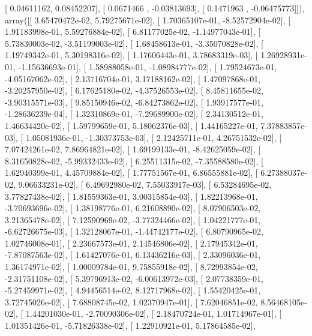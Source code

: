 \documentclass{article}
\begin{document}
       [ 0.04611162,  0.08452207],
       [ 0.0671466 , -0.03813693],
       [ 0.1471963 , -0.06475773]]), array([[  3.65470472e-02,   5.79275671e-02],
       [  1.70365107e-01,  -8.52572904e-02],
       [  1.91183998e-01,   5.59276884e-02],
       [  6.81177025e-02,  -1.14977043e-01],
       [  5.73830003e-02,  -3.51199003e-02],
       [  1.68458613e-01,  -3.35070828e-02],
       [  1.19749342e-01,   5.30198316e-02],
       [  1.17606443e-01,   3.78683319e-03],
       [  1.26928931e-01,  -1.15636693e-01],
       [  1.58988058e-01,  -1.08984777e-02],
       [  1.79524673e-01,  -4.05167062e-02],
       [  2.13716704e-01,   3.17188162e-02],
       [  1.47097868e-01,  -3.20257950e-02],
       [  6.17625180e-02,  -4.37526553e-02],
       [  8.45811655e-02,  -3.90315571e-03],
       [  9.85150946e-02,  -6.84273862e-02],
       [  1.93917577e-01,  -1.28636239e-04],
       [  1.32310869e-01,  -7.29689900e-02],
       [  2.34130512e-01,   1.46634420e-02],
       [  1.59799659e-01,   5.18062376e-03],
       [  1.44165227e-01,   7.37883857e-03],
       [  1.05081936e-01,  -1.30373753e-03],
       [  2.12425711e-01,   4.26751532e-02],
       [  7.07424261e-02,   7.86964821e-02],
       [  1.69199133e-01,  -8.42625059e-02],
       [  8.31650828e-02,  -5.99332433e-02],
       [  6.25511315e-02,  -7.35588580e-02],
       [  1.62940399e-01,   4.45709884e-02],
       [  1.77751567e-01,   6.86555881e-02],
       [  6.27388037e-02,   9.06633231e-02],
       [  6.49692980e-02,   7.55033917e-03],
       [  6.53284695e-02,   3.77827438e-02],
       [  1.81559363e-01,   3.00315854e-03],
       [  1.82213968e-01,  -3.70693696e-02],
       [  1.38198776e-01,   6.21608890e-02],
       [  8.07906503e-02,   3.21365478e-02],
       [  7.12590969e-02,  -3.77324466e-02],
       [  1.04221777e-01,  -6.62726675e-03],
       [  1.32128067e-01,  -1.44742177e-02],
       [  6.80790965e-02,   1.02746008e-01],
       [  2.23667573e-01,   2.14546806e-02],
       [  2.17945342e-01,  -7.87087563e-02],
       [  1.61427076e-01,   6.13436216e-03],
       [  2.33096036e-01,   1.36174971e-02],
       [  1.00009784e-01,   9.75855918e-02],
       [  8.72993854e-02,  -2.31751108e-02],
       [  5.39796913e-02,  -6.00613972e-03],
       [  2.07738359e-01,  -5.27459971e-02],
       [  4.94456514e-02,   8.12717968e-02],
       [  1.55420425e-01,   3.72745026e-02],
       [  7.68808745e-02,   1.02370947e-01],
       [  7.62046851e-02,   8.56468105e-02],
       [  1.44201030e-01,  -2.70090306e-02],
       [  2.18470724e-01,   1.01714967e-01],
       [  1.01351426e-01,  -5.71826338e-02],
       [  1.22910921e-01,   5.17864585e-02],
\end{document}
